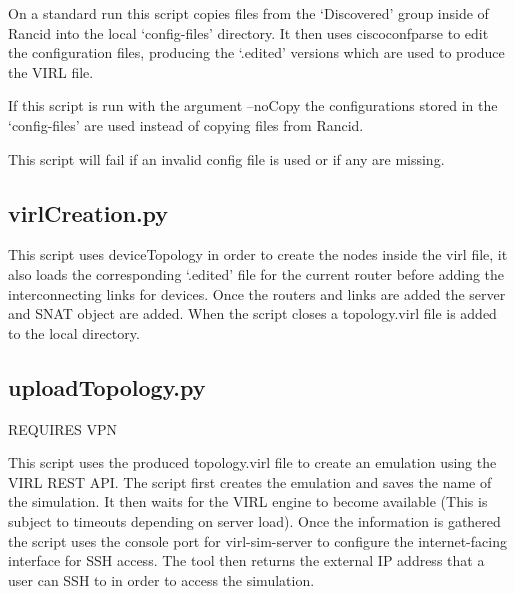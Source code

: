 \documentclass[11pt]{report}
\begin{document}
\begin{appendices}
On a standard run this script copies files from the `Discovered' group inside of Rancid into the local `config-files' directory. It then uses ciscoconfparse to edit the configuration files, producing the `.edited' versions which are used to produce the VIRL file.

If this script is run with the argument --noCopy the configurations stored in the `config-files' are used instead of copying files from Rancid.

This script will fail if an invalid config file is used or if any are missing.

\subsection{virlCreation.py}

This script uses deviceTopology in order to create the nodes inside the virl file, it also loads the corresponding `.edited' file for the current router before adding the interconnecting links for devices. Once the routers and links are added the server and SNAT object are added. When the script closes a topology.virl file is added to the local directory.

\subsection{uploadTopology.py}

REQUIRES VPN

This script uses the produced topology.virl file to create an emulation using the VIRL REST API. The script first creates the emulation and saves the name of the simulation. It then waits for the VIRL engine to become available (This is subject to timeouts depending on server load). Once the information is gathered the script uses the console port for virl-sim-server to configure the internet-facing interface for SSH access. The tool then returns the external IP address that a user can SSH to in order to access the simulation.

\end{appendices}
\end{document}
